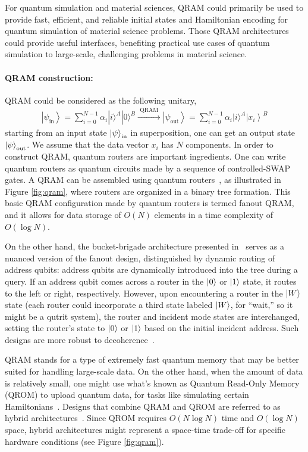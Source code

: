 For quantum simulation and material sciences, QRAM could primarily be used to provide fast, efficient, and reliable initial states and Hamiltonian encoding for quantum simulation of material science problems. Those QRAM architectures could provide useful interfaces, benefiting practical use cases of quantum simulation to large-scale, challenging problems in material science. 

\paragraph 
{QRAM construction: }QRAM could be considered as the following unitary,
\begin{align}
\left|\psi_{\text {in}}\right\rangle=\sum_{i=0}^{N-1} \alpha_i|i\rangle^A|0\rangle^B \stackrel{\text { QRAM }}{\longrightarrow}\left|\psi_{\text {out}}\right\rangle=\sum_{i=0}^{N-1} \alpha_i|i\rangle^A\left|x_i\right\rangle^B
\end{align}
starting from an input state $\ket{\psi}_{\text{in}}$ in superposition, one can get an output state $\ket{\psi}_{\text{out}}$. We assume that the data vector $x_i$ has $N$ components. In order to construct QRAM, quantum routers are important ingredients. One can write quantum routers as quantum circuits made by a sequence of controlled-SWAP gates. A QRAM can be assembled using quantum routers~\cite{nielsen2010quantum}, as illustrated in Figure \ref{fig:qram}, where routers are organized in a binary tree formation. This basic QRAM configuration made by quantum routers is termed fanout QRAM, and it allows for data storage of $O(N)$ elements in a time complexity of $O(\log N)$.

On the other hand, the bucket-brigade architecture presented in~\cite{giovannetti2008quantum} serves as a nuanced version of the fanout design, distinguished by dynamic routing of address qubits: address qubits are dynamically introduced into the tree during a query. If an address qubit comes across a router in the $\ket{0}$ or $\ket{1}$ state, it routes to the left or right, respectively. However, upon encountering a router in the $\ket{W}$ state (each router could incorporate a third state labeled $\ket{W}$, for ``wait,'' so it might be a qutrit system), the router and incident mode states are interchanged, setting the router's state to $\ket{0}$ or $\ket{1}$ based on the initial incident address. Such designs are more robust to decoherence~\cite{giovannetti2008quantum}. 

QRAM stands for a type of extremely fast quantum memory that may be better suited for handling large-scale data. On the other hand, when the amount of data is relatively small, one might use what's known as Quantum Read-Only Memory (QROM) to upload quantum data, for tasks like simulating certain Hamiltonians~\cite{babbush2018encoding}. Designs that combine QRAM and QROM are referred to as hybrid architectures~\cite{hann2021resilience}. Since QROM requires $O(N \log N)$ time and $O(\log N)$ space, hybrid architectures might represent a space-time trade-off for specific hardware conditions (see Figure \ref{fig:qram}).


